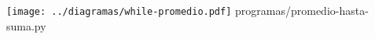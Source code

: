 \documentclass[12pt]{beamer}
\begin{document}
  \begin{frame}
    \label{diagrama-flujo-while}
    \begin{columns}
        \texttt{[image: ../diagramas/while-promedio.pdf]}
          {programas/promedio-hasta-suma.py}
    \end{columns}
  \end{frame}
\end{document}

